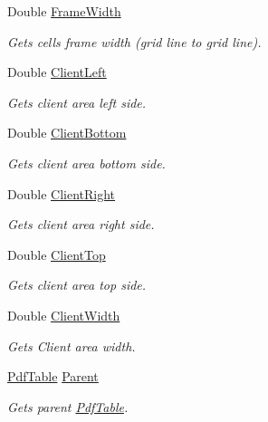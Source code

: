 \begin{DoxyCompactItemize}
Double \hyperlink{class_pdf_file_writer_1_1_pdf_table_cell_ad3e6cb4db7db7f373cd4272a737e362c}{Frame\+Width}
\begin{DoxyCompactList}\small\item\em Gets cell\textquotesingle{}s frame width (grid line to grid line). \end{DoxyCompactList}\item 
Double \hyperlink{class_pdf_file_writer_1_1_pdf_table_cell_a663f77eb8443cf0e7eba1c79fe75313a}{Client\+Left}
\begin{DoxyCompactList}\small\item\em Gets client area left side. \end{DoxyCompactList}\item 
Double \hyperlink{class_pdf_file_writer_1_1_pdf_table_cell_a6df28b9f502f3675e45020d040069491}{Client\+Bottom}
\begin{DoxyCompactList}\small\item\em Gets client area bottom side. \end{DoxyCompactList}\item 
Double \hyperlink{class_pdf_file_writer_1_1_pdf_table_cell_add61148ee66bb413cc7be9bde66af08c}{Client\+Right}
\begin{DoxyCompactList}\small\item\em Gets client area right side. \end{DoxyCompactList}\item 
Double \hyperlink{class_pdf_file_writer_1_1_pdf_table_cell_a626f13cc9a1c652d9953c415ef6286e1}{Client\+Top}
\begin{DoxyCompactList}\small\item\em Gets client area top side. \end{DoxyCompactList}\item 
Double \hyperlink{class_pdf_file_writer_1_1_pdf_table_cell_a28f60183e871928f9b8e52ffa5637cd9}{Client\+Width}
\begin{DoxyCompactList}\small\item\em Gets Client area width. \end{DoxyCompactList}\item 
\hyperlink{class_pdf_file_writer_1_1_pdf_table}{Pdf\+Table} \hyperlink{class_pdf_file_writer_1_1_pdf_table_cell_a0e65638e93396abb8b75ffc97c4ad032}{Parent}
\begin{DoxyCompactList}\small\item\em Gets parent \hyperlink{class_pdf_file_writer_1_1_pdf_table}{Pdf\+Table}. \end{DoxyCompactList}\end{DoxyCompactItemize}


